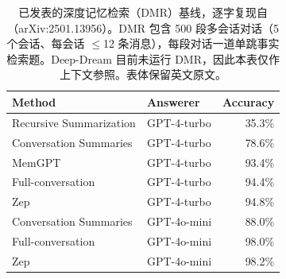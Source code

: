 \begin{table}[t]
\centering
\caption{已发表的深度记忆检索（DMR）基线，逐字复现自 \citet{rasmussen2025zep}（arXiv:2501.13956）。DMR 包含 500 段多会话对话（5 个会话、每会话 $\le$12 条消息），每段对话一道单跳事实检索题。Deep-Dream 目前未运行 DMR，因此本表仅作上下文参照。表体保留英文原文。}
\label{tab:zep-dmr}
\small
\begin{tabular}{llr}
\toprule
Method & Answerer & Accuracy \\
\midrule
Recursive Summarization & GPT-4-turbo & 35.3\% \\
Conversation Summaries & GPT-4-turbo & 78.6\% \\
MemGPT & GPT-4-turbo & 93.4\% \\
Full-conversation & GPT-4-turbo & 94.4\% \\
Zep & GPT-4-turbo & 94.8\% \\
Conversation Summaries & GPT-4o-mini & 88.0\% \\
Full-conversation & GPT-4o-mini & 98.0\% \\
Zep & GPT-4o-mini & 98.2\% \\
\bottomrule
\end{tabular}
\end{table}
